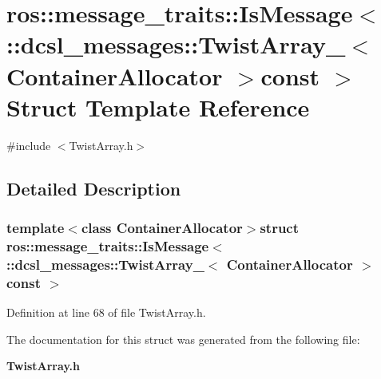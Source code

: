 \section{ros\-:\-:message\-\_\-traits\-:\-:\-Is\-Message$<$ \-:\-:dcsl\-\_\-messages\-:\-:\-Twist\-Array\-\_\-$<$ \-Container\-Allocator $>$const $>$ \-Struct \-Template \-Reference}
\label{structros_1_1message__traits_1_1IsMessage_3_01_1_1dcsl__messages_1_1TwistArray___3_01ContainerAllocator_01_4const_01_01_4}


{\ttfamily \#include $<$\-Twist\-Array.\-h$>$}



\subsection{\-Detailed \-Description}
\subsubsection*{template$<$class Container\-Allocator$>$struct ros\-::message\-\_\-traits\-::\-Is\-Message$<$ \-::dcsl\-\_\-messages\-::\-Twist\-Array\-\_\-$<$ Container\-Allocator $>$const  $>$}



\-Definition at line 68 of file \-Twist\-Array.\-h.



\-The documentation for this struct was generated from the following file\-:\begin{DoxyCompactItemize}
\item 
{\bf \-Twist\-Array.\-h}\end{DoxyCompactItemize}
